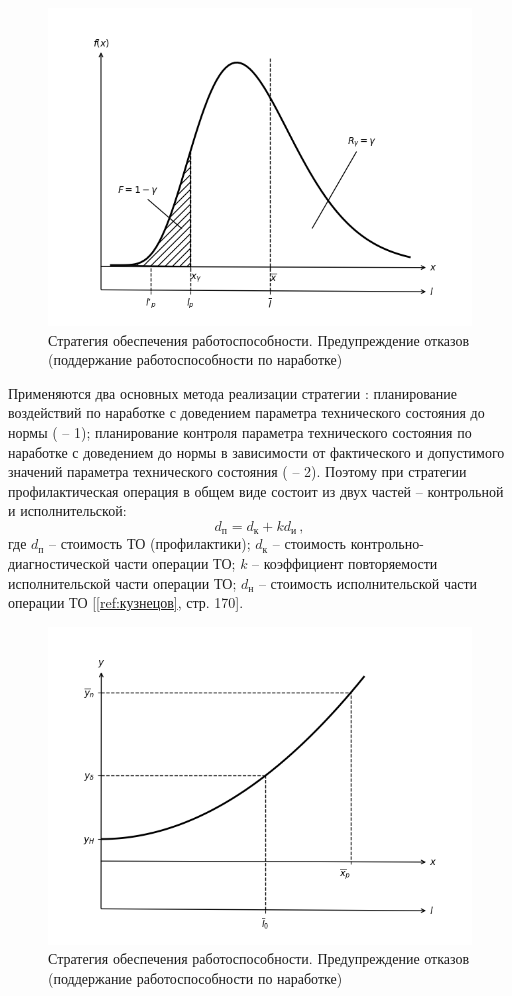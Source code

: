 \documentclass[../nirs.tex]{subfiles}
\begin{document}
\begin{figure}[H]
\centering
\includegraphics[keepaspectratio,width=\textwidth]{./images/pdf.b.png}
\caption{Стратегия обеспечения работоспособности. Предупреждение отказов
    (поддержание работоспособности по наработке)}
\label{fig:pdf.b}
\end{figure}

Применяются два основных метода реализации стратегии : планирование
воздействий по наработке с доведением параметра технического состояния до нормы
( -- 1); планирование контроля параметра технического состояния по
наработке с доведением до нормы в зависимости от фактического и допустимого
значений параметра технического состояния ( -- 2). Поэтому при стратегии
 профилактическая операция в общем виде состоит из двух частей --
контрольной и исполнительской:
\begin{equation*}
    d_{\text{п}} = d_{\text{к}} + k d_{\text{и}}\,,
\end{equation*}
где $d_{\text{п}}$ -- стоимость ТО (профилактики); $d_{\text{к}}$ -- стоимость
контрольно-диагностической части операции ТО; $k$ -- коэффициент повторяемости
исполнительской части операции ТО; $d_{\text{н}}$ -- стоимость исполнительской
части операции ТО [\ref{ref:кузнецов}, стр. 170].

\begin{figure}[H]
\centering
\includegraphics[keepaspectratio,width=\textwidth]{./images/pdf.c.png}
\caption{Стратегия обеспечения работоспособности. Предупреждение отказов
    (поддержание работоспособности по наработке)}
\label{fig:pdf.c}
\end{figure}
\end{document}

